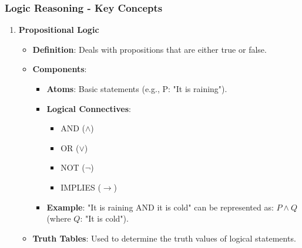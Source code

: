 \documentclass[aspectratio=169]{beamer}
\begin{document}
\begin{frame}[fragile]
    \frametitle{Logic Reasoning - Key Concepts}
    \begin{enumerate}
        \item \textbf{Propositional Logic}
        \begin{itemize}
            \item \textbf{Definition}: Deals with propositions that are either true or false.
            \item \textbf{Components}:
            \begin{itemize}
                \item \textbf{Atoms}: Basic statements (e.g., P: "It is raining").
                \item \textbf{Logical Connectives}:
                \begin{itemize}
                    \item AND ($\land$)
                    \item OR ($\lor$)
                    \item NOT ($\neg$)
                    \item IMPLIES ($\rightarrow$)
                \end{itemize}
                \item \textbf{Example}: "It is raining AND it is cold" can be represented as: $P \land Q$ (where $Q$: "It is cold").
            \end{itemize}
            \item \textbf{Truth Tables}: Used to determine the truth values of logical statements.
        \end{itemize}


\end{enumerate}
\end{frame}
\end{document}
